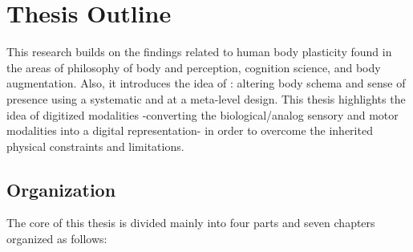 \pagebreak
\section{Thesis Outline}

This research builds on the findings related to human body plasticity found in the areas of philosophy of body and perception, cognition science, and body augmentation. Also, it introduces the idea of \ProposalKeyword: altering body schema and sense of presence using a systematic and at a meta-level design. This thesis highlights the idea of digitized modalities -converting the biological/analog sensory and motor modalities into a digital representation- in order to overcome the inherited physical constraints and limitations. 




\subsection{Organization}

The core of this thesis is divided mainly into four parts and seven chapters organized as follows:

